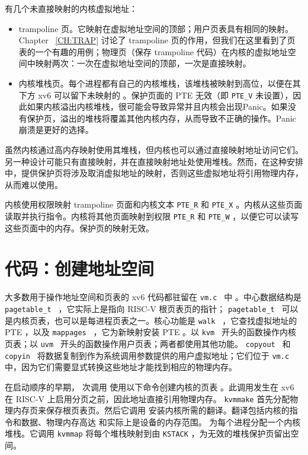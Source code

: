 有几个未直接映射的内核虚拟地址：  

   \begin{itemize}

 
   \item   trampoline 页。它映射在虚拟地址空间的顶部；用户页表具有相同的映射。 Chapter~    \ref{CH:TRAP}    讨论了 trampoline 页的作用，但我们在这里看到了页表的一个有趣的用例；物理页（保存 trampoline 代码）在内核的虚拟地址空间中映射两次：一次在虚拟地址空间的顶部，一次是直接映射。   \item   内核堆栈页。每个进程都有自己的内核堆栈，该堆栈被映射到高位，以便在其下方 xv6 可以留下未映射的        。保护页面的 PTE 无效（即
    \lstinline{PTE_V}    未设置），因此如果内核溢出内核堆栈，很可能会导致异常并且内核会出现Panic。如果没有保护页，溢出的堆栈将覆盖其他内核内存，从而导致不正确的操作。Panic崩溃是更好的选择。  \end{itemize}     

虽然内核通过高内存映射使用其堆栈，但内核也可以通过直接映射地址访问它们。另一种设计可能只有直接映射，并在直接映射地址处使用堆栈。然而，在这种安排中，提供保护页将涉及取消虚拟地址的映射，否则这些虚拟地址将引用物理内存，从而难以使用。  

内核使用权限映射 trampoline 页面和内核文本
    \lstinline{PTE_R}    和
    \lstinline{PTE_X}    。内核从这些页面读取并执行指令。内核将其他页面映射到权限
    \lstinline{PTE_R}    和
    \lstinline{PTE_W}    ，以便它可以读写这些页面中的内存。保护页的映射无效。
    \section{代码：创建地址空间  }     

大多数用于操作地址空间和页表的 xv6 代码都驻留在  {    \tt    vm.c   }  中
        。中心数据结构是  {    \tt    pagetable\_t   }  ，它实际上是指向 RISC-V 根页表页的指针； {    \tt    pagetable\_t   }  可以是内核页表，也可以是每进程页表之一。核心功能是  {    \tt    walk   }  ，它查找虚拟地址的 PTE ，以及  {    \tt    mappages   }  ，它为新映射安装 PTE 。以  {    \tt    kvm   }  开头的函数操作内核页表；以  {    \tt    uvm   }  开头的函数操作用户页表；两者都使用其他功能。
  {    \tt    copyout   }  和  {    \tt    copyin   }  将数据复制到作为系统调用参数提供的用户虚拟地址；它们位于  {    \tt    vm.c   }  中，因为它们需要显式转换这些地址才能找到相应的物理内存。  

在启动顺序的早期，
        次调用
        使用以下命令创建内核的页表
        。此调用发生在 xv6 在 RISC-V 上启用分页之前，因此地址直接引用物理内存。
    \lstinline{kvmmake}    首先分配物理内存页来保存根页表页。然后它调用
        安装内核所需的翻译。翻译包括内核的指令和数据、物理内存高达
        和实际上是设备的内存范围。
        为每个进程分配一个内核堆栈。它调用    \lstinline{kvmmap}    将每个堆栈映射到由
    \lstinline{KSTACK}    ，为无效的堆栈保护页留出空间。  

